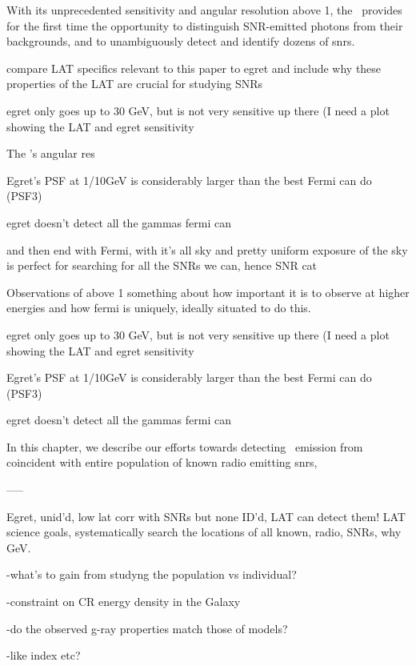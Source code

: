 {With its unprecedented sensitivity and angular resolution above 1\gev, the \lat~provides for the first time the opportunity to distinguish SNR-emitted photons from their backgrounds, and  to unambiguously detect and identify dozens of \glspl{snr}. 

compare LAT specifics relevant to this paper to egret and include why these properties of the LAT are crucial for studying SNRs

egret only goes up to 30 GeV, but is not very sensitive up there (I need a plot showing the LAT and egret sensitivity

The \lat{}'s angular res

Egret's PSF at 1/10GeV is considerably larger than the best Fermi can do (PSF3)

egret doesn't detect all the gammas fermi can

and then end with Fermi, with it's all sky and pretty uniform exposure of the sky is perfect for searching for all the SNRs we can, hence SNR cat

Observations of \snr above 1\gev 
something about how important it is to observe at higher energies and how fermi is uniquely, ideally situated to do this. 



egret only goes up to 30 GeV, but is not very sensitive up there (I need a plot showing the LAT and egret sensitivity

Egret's PSF at 1/10GeV is considerably larger than the best Fermi can do (PSF3)

egret doesn't detect all the gammas fermi can



In this chapter, we describe our efforts towards detecting \gam~emission from coincident with entire population of known radio emitting \glspl{snr}, 



-----

Egret, unid'd, low lat corr with SNRs but none ID'd, LAT can detect them! LAT science goals, systematically search the locations of all known, radio, SNRs, why GeV.

    -what's to gain from studyng the population vs individual?
    
    -constraint on CR energy density in the Galaxy
    
    -do the observed g-ray properties match those
     of models?

    -like index etc?
   
}
